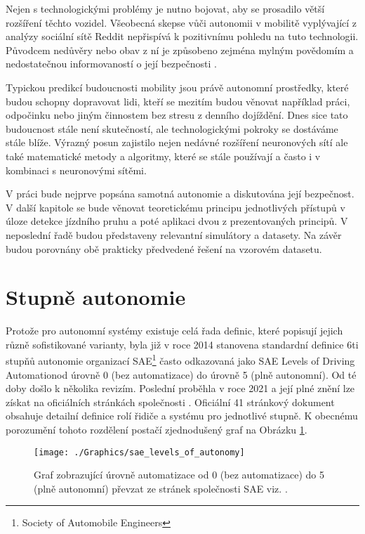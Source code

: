 \documentclass[czech, bc, kky, he, iso690alph]{fasthesis}
\begin{document}
		Nejen s technologickými problémy je nutno bojovat, aby se prosadilo větší rozšíření těchto vozidel. Všeobecná skepse vůči autonomii v mobilitě vyplývající z analýzy sociální sítě Reddit \cite{public_opinion_on_AV} nepřispívá k pozitivnímu pohledu na tuto technologii. Původcem nedůvěry nebo obav z ní je způsobeno zejména mylným povědomím a nedostatečnou informovaností o její bezpečnosti \cite{AV_vs_CV_crashes}.
		
		Typickou predikcí budoucnosti mobility jsou právě autonomní prostředky, které budou schopny dopravovat lidi, kteří se mezitím budou věnovat například práci, odpočinku nebo jiným činnostem bez stresu z denního dojíždění. Dnes sice tato budoucnost stále není skutečností, ale technologickými pokroky se dostáváme stále blíže. Výrazný posun zajistilo nejen nedávné rozšíření neuronových sítí ale také matematické metody a algoritmy, které se stále používají a často i v kombinaci s neuronovými sítěmi.
		
		V práci bude nejprve popsána samotná autonomie a diskutována její bezpečnost. V další kapitole se bude věnovat teoretickému principu jednotlivých přístupů v úloze detekce jízdního pruhu a poté aplikaci dvou z prezentovaných principů. V neposlední řadě budou představeny relevantní simulátory a datasety. Na závěr budou porovnány obě prakticky předvedené řešení na vzorovém datasetu.
    
    \section{Stupně autonomie}
       	Protože pro autonomní systémy existuje celá řada definic, které popisují jejich různě sofistikované varianty, byla již v roce 2014 stanovena standardní definice 6ti stupňů autonomie organizací SAE\footnote{Society of Automobile Engineers} často odkazovaná jako SAE Levels of Driving Automation\texttrademark od úrovně 0 (bez automatizace) do  úrovně 5 (plně autonomní). Od té doby došlo k několika revizím. Poslední proběhla v roce 2021 a její plné znění lze získat na oficiálních stránkách společnosti \cite{SAE_autonomy_levels}. Oficiální 41 stránkový dokument obsahuje detailní definice rolí řidiče a systému pro jednotlivé stupně. K obecnému porozumění tohoto rozdělení postačí zjednodušený graf na Obrázku \ref{pic:levels_of_autonomy}.
       	
       		\begin{figure}[h]
       			\centering
       			\texttt{[image: ./Graphics/sae\_levels\_of\_autonomy]}
       			\caption{Graf zobrazující úrovně automatizace od 0 (bez automatizace) do 5 (plně autonomní) převzat ze stránek společnosti SAE viz. \cite{SAE_autonomy_levels_web}.}
       			\label{pic:levels_of_autonomy}
       		\end{figure}
       	
\end{document}
